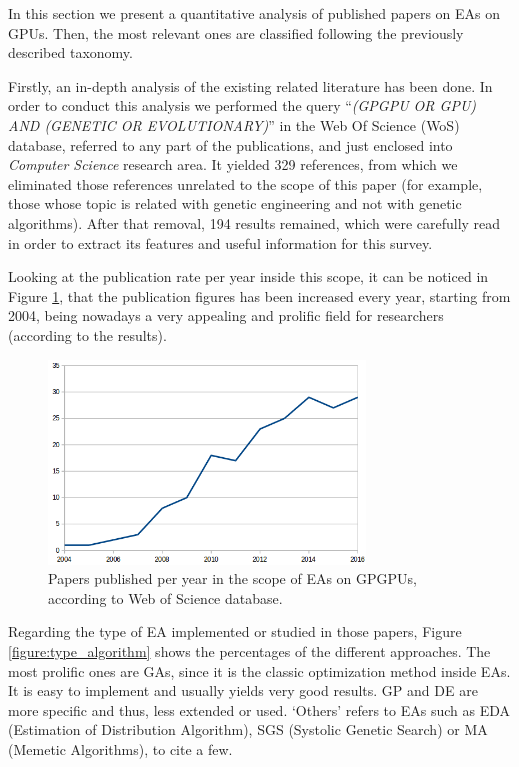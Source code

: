 \documentclass{article}
\begin{document}
In this section we present a quantitative analysis of published papers
on EAs on GPUs. Then, the most relevant ones are classified following
the previously described taxonomy.

Firstly, an in-depth analysis of the existing related literature has been done. In order to conduct this analysis we performed the query ``\textit{(GPGPU OR GPU) AND (GENETIC OR EVOLUTIONARY)}'' in the Web Of Science (WoS) \cite{wos} database, referred to any part of the publications, and just enclosed into {\em Computer Science} research area.
It yielded 329 references, from which we eliminated those references unrelated to the scope of this paper (for example, those whose topic is related with genetic engineering and not with genetic algorithms). After that removal, 194 results remained, which were carefully read in order to extract its features and useful information for this survey.

Looking at the publication rate per year inside this scope, it can be noticed in Figure \ref{figure:publications}, that the publication figures has been increased every year, starting from 2004, being nowadays a very appealing and prolific field for researchers  (according to the results).

\begin{figure}[!ht]
\centering
\includegraphics[width=0.75\textwidth]{years}
\caption{Papers published per year in the scope of EAs on GPGPUs, according to Web of Science database.}
\label{figure:publications}
\end{figure}


Regarding the type of EA implemented or studied in those papers, Figure \ref{figure:type_algorithm} shows the percentages of the different approaches. The most prolific ones are GAs, since it is the classic optimization method inside EAs. It is easy to implement and usually yields very good results.  GP and DE are more specific and thus, less extended or used. `Others' refers to EAs such as EDA (Estimation of Distribution Algorithm), SGS (Systolic Genetic Search) or MA (Memetic Algorithms), to cite a few.
\end{document}
